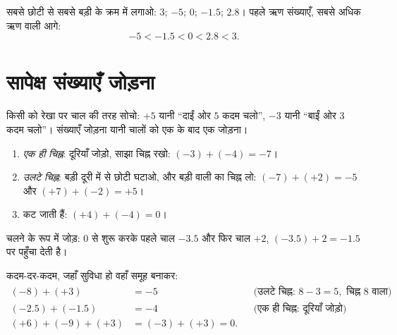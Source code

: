 \begin{example}\label{ex:g7:negatives:compare}
सबसे छोटी से सबसे बड़ी के क्रम में लगाओ: $3$; $-5$; $0$; $-1.5$; $2.8$।
पहले ऋण संख्याएँ, सबसे अधिक ऋण वाली आगे:
\[
-5 < -1.5 < 0 < 2.8 < 3 .
\]
\end{example}

\section{सापेक्ष संख्याएँ जोड़ना}

किसी  को रेखा पर चाल की तरह सोचो: $+5$ यानी
``दाईं ओर $5$ कदम चलो'', $-3$ यानी ``बाईं ओर $3$ कदम चलो''।
संख्याएँ जोड़ना यानी चालों को एक के बाद एक जोड़ना।

\begin{method}[दो सापेक्ष संख्याएँ जोड़ना]\label{met:g7:negatives:add}
\begin{enumerate}
  \item \emph{एक ही चिह्न}: दूरियाँ जोड़ो, साझा चिह्न रखो:
        $(-3) + (-4) = -7$।
  \item \emph{उलटे चिह्न}: बड़ी दूरी में से छोटी घटाओ, और बड़ी
        वाली का चिह्न लो:
        $(-7) + (+2) = -5$ और $(+7) + (-2) = +5$।
  \item {} कट जाती हैं: $(+4) + (-4) = 0$।
\end{enumerate}
\end{method}

\begin{omfigure}

{\small चलने के रूप में जोड़: $0$ से शुरू करके पहले चाल $-3.5$ और
फिर चाल $+2$, $(-3.5) + 2 = -1.5$ पर पहुँचा देती है।}
\end{omfigure}

\begin{example}\label{ex:g7:negatives:add}
कदम-दर-कदम, जहाँ सुविधा हो वहाँ समूह बनाकर:
\begin{align*}
(-8) + (+3) &= -5 && \text{(उलटे चिह्न: } 8 - 3 = 5,
\text{ चिह्न } 8 \text{ वाला)}\\
(-2.5) + (-1.5) &= -4 && \text{(एक ही चिह्न: दूरियाँ जोड़ो)}\\
(+6) + (-9) + (+3) &= (-3) + (+3) = 0 .
\end{align*}
\end{example}

